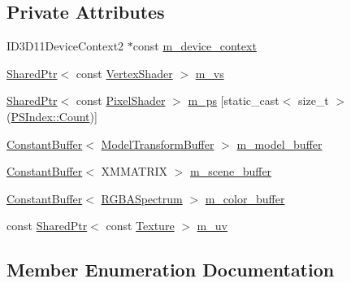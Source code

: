 \subsection*{Private Attributes}
\begin{DoxyCompactItemize}
\item 
I\+D3\+D11\+Device\+Context2 $\ast$const \hyperlink{classmage_1_1_constant_component_pass_af5a2ec9190b657a0e5cf3786c35f0336}{m\+\_\+device\+\_\+context}
\item 
\hyperlink{namespacemage_a1e01ae66713838a7a67d30e44c67703e}{Shared\+Ptr}$<$ const \hyperlink{classmage_1_1_vertex_shader}{Vertex\+Shader} $>$ \hyperlink{classmage_1_1_constant_component_pass_af1667cb1e2aaf5bf16aaf0655a8c37e3}{m\+\_\+vs}
\item 
\hyperlink{namespacemage_a1e01ae66713838a7a67d30e44c67703e}{Shared\+Ptr}$<$ const \hyperlink{namespacemage_ac98506b7edd999ea43ec46fbd0330238}{Pixel\+Shader} $>$ \hyperlink{classmage_1_1_constant_component_pass_acc8d02f8e3d1c7fa633175a70bd9b6ff}{m\+\_\+ps} \mbox{[}static\+\_\+cast$<$ size\+\_\+t $>$(\hyperlink{classmage_1_1_constant_component_pass_a5700234587f2aa0ebdb4f7790704f00bae93f994f01c537c4e2f7d8528c3eb5e9}{P\+S\+Index\+::\+Count})\mbox{]}
\item 
\hyperlink{structmage_1_1_constant_buffer}{Constant\+Buffer}$<$ \hyperlink{structmage_1_1_model_transform_buffer}{Model\+Transform\+Buffer} $>$ \hyperlink{classmage_1_1_constant_component_pass_a3b0178d3fdfd6f413524bdb2364de40f}{m\+\_\+model\+\_\+buffer}
\item 
\hyperlink{structmage_1_1_constant_buffer}{Constant\+Buffer}$<$ X\+M\+M\+A\+T\+R\+IX $>$ \hyperlink{classmage_1_1_constant_component_pass_a21e24e6ae1ed28f9c0bd339b68119574}{m\+\_\+scene\+\_\+buffer}
\item 
\hyperlink{structmage_1_1_constant_buffer}{Constant\+Buffer}$<$ \hyperlink{structmage_1_1_r_g_b_a_spectrum}{R\+G\+B\+A\+Spectrum} $>$ \hyperlink{classmage_1_1_constant_component_pass_aa1a97c7be7054c1a1362ca15d9909446}{m\+\_\+color\+\_\+buffer}
\item 
const \hyperlink{namespacemage_a1e01ae66713838a7a67d30e44c67703e}{Shared\+Ptr}$<$ const \hyperlink{classmage_1_1_texture}{Texture} $>$ \hyperlink{classmage_1_1_constant_component_pass_ad69f0d02de95b9125651b447cd8fd884}{m\+\_\+uv}
\end{DoxyCompactItemize}


\subsection{Member Enumeration Documentation}
\hypertarget{classmage_1_1_constant_component_pass_a5700234587f2aa0ebdb4f7790704f00b}{}\label{classmage_1_1_constant_component_pass_a5700234587f2aa0ebdb4f7790704f00b} 
